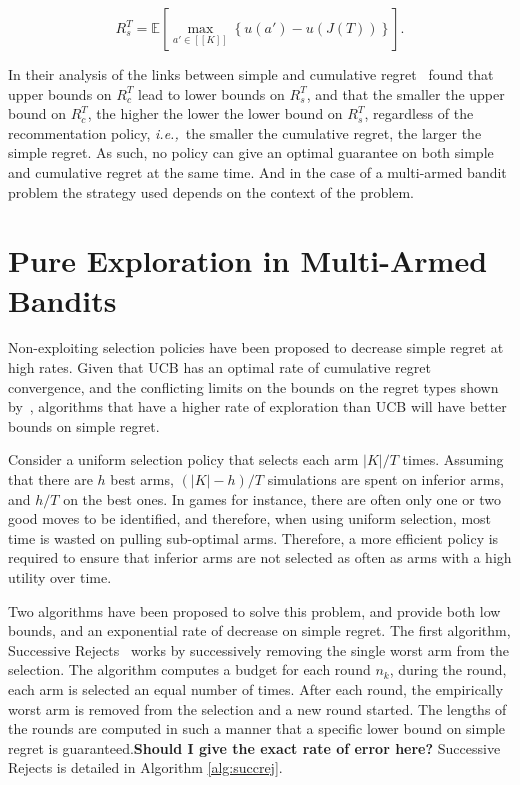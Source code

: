\documentclass{kecsmstr}
\newcommand{\bE}{\mathbb{E}}
\newcommand{\ie}{{\it i.e.,}~}
\newcommand{\redbold}[1]{\textbf{\color{red}#1}}
\begin{document}
\begin{equation}
R_s^T = \bE \left[  \max_{a' \in [[K]]} \left\{ u(a') - u(J(T)) \right\} \right].
\end{equation}

In their analysis of the links between simple and cumulative regret~ found that upper bounds on $R_c^T$ lead to lower bounds on $R_s^T$, and that the smaller the upper bound on $R_c^T$, the higher the lower the lower bound on $R_s^T$, regardless of the recommentation policy, \ie the smaller the cumulative regret, the larger the simple regret. As such, no policy can give an optimal guarantee on both simple and cumulative regret at the same time. And in the case of a multi-armed bandit problem the strategy used depends on the context of the problem.

\section{Pure Exploration in Multi-Armed Bandits}

Non-exploiting selection policies have been proposed to decrease simple regret at high rates. Given that UCB has an optimal rate of cumulative regret convergence, and the conflicting limits on the bounds on the regret types shown by~, algorithms that have a higher rate of exploration than UCB will have better bounds on simple regret. 

Consider a uniform selection policy that selects each arm $|K|/T$ times. Assuming that there are $h$ best arms, $(|K|-h)/T$ simulations are spent on inferior arms, and $h/T$ on the best ones. In games for instance, there are often only one or two good moves to be identified, and therefore, when using uniform selection, most time is wasted on pulling sub-optimal arms. Therefore, a more efficient policy is required to ensure that inferior arms are not selected as often as arms with a high utility over time.

Two algorithms have been proposed to solve this problem, and provide both low bounds, and an exponential rate of decrease on simple regret. The first algorithm, Successive Rejects~ works by successively removing the single worst arm from the selection. The algorithm computes a budget for each round $n_k$, during the round, each arm is selected an equal number of times. After each round, the empirically worst arm is removed from the selection and a new round started. The lengths of the rounds are computed in such a manner that a specific lower bound on simple regret is guaranteed.\redbold{Should I give the exact rate of error here?} Successive Rejects is detailed in Algorithm \ref{alg:succrej}.
\end{document}
